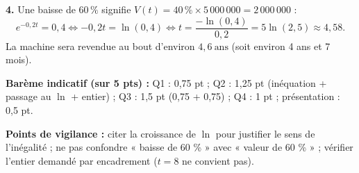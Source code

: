 \documentclass[11pt]{article}
\begin{document}
\begin{corrige}
\textbf{4.} Une baisse de $60\,\%$ signifie $V(t)=40\,\%\times 5\,000\,000 = 2\,000\,000$ :
\[ e^{-0,2t} = 0{,}4 \iff -0{,}2t = \ln(0{,}4) \iff t = \frac{-\ln(0{,}4)}{0{,}2} = 5\ln(2{,}5)\approx 4{,}58. \]
La machine sera revendue au bout d'environ $\boxed{4{,}6\ \text{ans}}$ (soit environ 4 ans et 7 mois).

\textbf{Barème indicatif (sur 5 pts) :} Q1 : 0,75 pt ; Q2 : 1,25 pt (inéquation + passage au $\ln$ + entier) ; Q3 : 1,5 pt (0,75 + 0,75) ; Q4 : 1 pt ; présentation : 0,5 pt.

\textbf{Points de vigilance :} citer la croissance de $\ln$ pour justifier le sens de l'inégalité ; ne pas confondre « baisse de 60 \% » avec « valeur de 60 \% » ; vérifier l'entier demandé par encadrement ($t=8$ ne convient pas).
\end{corrige}
\end{document}

